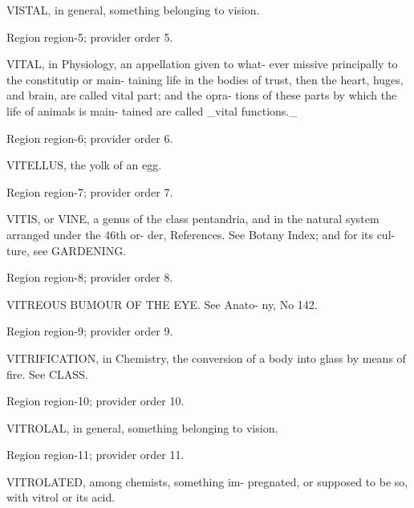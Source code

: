 \documentclass[11pt]{article}
\begin{document}
VISTAL, in general, something belonging to vision.
\par

{\scriptsize\color{gray} Region region-5; provider order 5.\par}
\medskip

VITAL, in Physiology, an appellation given to what-
ever missive principally to the constitutip or main-
taining life in the bodies of trust, then the heart,
huges, and brain, are called vital part; and the opra-
tions of these parts by which the life of animals is main-
tained are called \_vital functions.\_
\par

{\scriptsize\color{gray} Region region-6; provider order 6.\par}
\medskip

VITELLUS, the yolk of an egg.
\par

{\scriptsize\color{gray} Region region-7; provider order 7.\par}
\medskip

VITIS, or VINE, a genus of the class pentandria,
and in the natural system arranged under the 46th or-
der, References. See Botany Index; and for its cul-
ture, see GARDENING.
\par

{\scriptsize\color{gray} Region region-8; provider order 8.\par}
\medskip

VITREOUS BUMOUR OF THE EYE. See Anato-
ny, No 142.
\par

{\scriptsize\color{gray} Region region-9; provider order 9.\par}
\medskip

VITRIFICATION, in Chemistry, the conversion
of a body into glass by means of fire. See CLASS.
\par

{\scriptsize\color{gray} Region region-10; provider order 10.\par}
\medskip

VITROLAL, in general, something belonging to vision.
\par

{\scriptsize\color{gray} Region region-11; provider order 11.\par}
\medskip

VITROLATED, among chemists, something im-
pregnated, or supposed to be so, with vitrol or its acid.
\par
\end{document}

